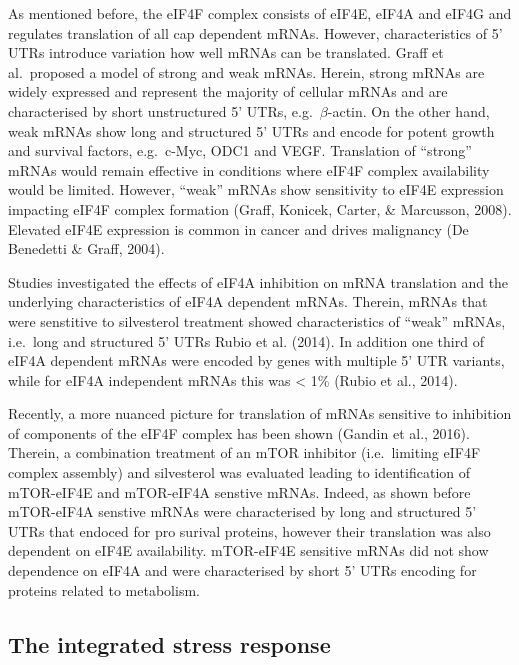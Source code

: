 \documentclass[
  12pt,
  openany]{book}
\begin{document}
As mentioned before, the eIF4F complex consists of eIF4E, eIF4A and eIF4G and regulates translation of all cap dependent mRNAs. However, characteristics of 5' UTRs introduce variation how well mRNAs can be translated. Graff et al.~proposed a model of strong and weak mRNAs. Herein, strong mRNAs are widely expressed and represent the majority of cellular mRNAs and are characterised by short unstructured 5' UTRs, e.g.~\(\beta\)-actin. On the other hand, weak mRNAs show long and structured 5' UTRs and encode for potent growth and survival factors, e.g.~c-Myc, ODC1 and VEGF. Translation of ``strong'' mRNAs would remain effective in conditions where eIF4F complex availability would be limited. However, ``weak'' mRNAs show sensitivity to eIF4E expression impacting eIF4F complex formation (Graff, Konicek, Carter, \& Marcusson, 2008). Elevated eIF4E expression is common in cancer and drives malignancy (De Benedetti \& Graff, 2004).

Studies investigated the effects of eIF4A inhibition on mRNA translation and the underlying characteristics of eIF4A dependent mRNAs. Therein, mRNAs that were senstitive to silvesterol treatment showed characteristics of ``weak'' mRNAs, i.e.~long and structured 5' UTRs Rubio et al. (2014). In addition one third of eIF4A dependent mRNAs were encoded by genes with multiple 5' UTR variants, while for eIF4A independent mRNAs this was \textless{} 1\% (Rubio et al., 2014).

Recently, a more nuanced picture for translation of mRNAs sensitive to inhibition of components of the eIF4F complex has been shown (Gandin et al., 2016). Therein, a combination treatment of an mTOR inhibitor (i.e.~limiting eIF4F complex assembly) and silvesterol was evaluated leading to identification of mTOR-eIF4E and mTOR-eIF4A senstive mRNAs. Indeed, as shown before mTOR-eIF4A senstive mRNAs were characterised by long and structured 5' UTRs that endoced for pro surival proteins, however their translation was also dependent on eIF4E availability. mTOR-eIF4E sensitive mRNAs did not show dependence on eIF4A and were characterised by short 5' UTRs encoding for proteins related to metabolism.

\subsection{The integrated stress response}
\end{document}
